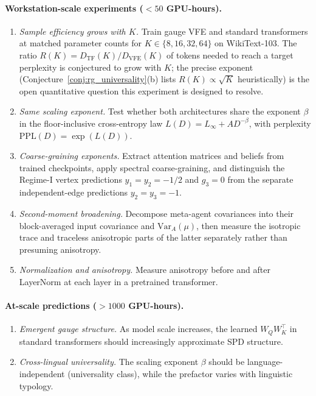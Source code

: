 \documentclass[twoside,11pt]{article}
\begin{document}
\paragraph{Workstation-scale experiments ($<50$ GPU-hours).}
\begin{enumerate}
\item \emph{Sample efficiency grows with $K$.} Train gauge VFE and standard transformers at matched parameter counts for $K \in \{8, 16, 32, 64\}$ on WikiText-103. The ratio $R(K) = D_{\mathrm{TF}}(K) / D_{\mathrm{VFE}}(K)$ of tokens needed to reach a target perplexity is conjectured to grow with $K$; the precise exponent (Conjecture~\ref{conj:rg_universality}(b) lists $R(K) \propto \sqrt{K}$ heuristically) is the open quantitative question this experiment is designed to resolve.
\item \emph{Same scaling exponent.} Test whether both architectures share the exponent $\beta$ in the floor-inclusive cross-entropy law $L(D)=L_\infty+A D^{-\beta}$, with perplexity $\mathrm{PPL}(D)=\exp(L(D))$.
\item \emph{Coarse-graining exponents.} Extract attention matrices and beliefs from trained checkpoints, apply spectral coarse-graining, and distinguish the Regime-I vertex predictions $y_1=y_2=-1/2$ and $g_3=0$ from the separate independent-edge predictions $y_2=y_3=-1$.
\item \emph{Second-moment broadening.} Decompose meta-agent covariances into their block-averaged input covariance and $\mathrm{Var}_A(\mu)$, then measure the isotropic trace and traceless anisotropic parts of the latter separately rather than presuming anisotropy.
\item \emph{Normalization and anisotropy.} Measure anisotropy before and after LayerNorm at each layer in a pretrained transformer.
\end{enumerate}

\paragraph{At-scale predictions ($>1000$ GPU-hours).}
\begin{enumerate}
\item \emph{Emergent gauge structure.} As model scale increases, the learned $W_Q W_K^\top$ in standard transformers should increasingly approximate SPD structure.
\item \emph{Cross-lingual universality.} The scaling exponent $\beta$ should be language-independent (universality class), while the prefactor varies with linguistic typology.
\end{enumerate}
\end{document}

